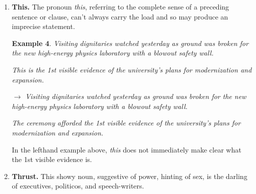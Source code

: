 \documentclass{article}
\newtheorem{example}{Example}
\begin{document}
\begin{enumerate}
	But it often doesn't work, if only because repetition makes it sound boring or silly.
	
	Consider these strategies to avoid an awkward overuse of {\it he or she} or an unintentional emphasis on the masculine:
	
	Use the plural rather than the singular.
	\begin{example}
		The writer must address his readers' concerns.
		
		$\to$ Writers must address their readers' concerns.
	\end{example}
	Eliminate the pronoun altogether.
	\begin{example}
		The writer must address his readers' concerns.
		
		$\to$ The writer must address reader's concerns.
	\end{example}
	Substitute the 2nd person for the 3rd person.
	\begin{example}
		The writer must address his readers' concerns.
		
		$\to$ As a writer, you must address your readers' concerns.
	\end{example}
	No one need fear to use {\it he} if common sense supports it.
	
	If you think {\it she} is a handy substitute for {\it he}, try it and see what happens.
	
	Alternatively, put all controversial nouns in the plural and avoid the choice of sex altogether, although you may find your prose sounding general and diffuse as a result.
	\item {\bf This.} The pronoun {\it this}, referring to the complete sense of a preceding sentence or clause, can't always carry the load and so may produce an imprecise statement.
	\begin{example}
		Visiting dignitaries watched yesterday as ground was broken for the new high-energy physics laboratory with a blowout safety wall.
		
		This is the 1st visible evidence of the university's plans for modernization and expansion.
		
		$\to$ Visiting dignitaries watched yesterday as ground was broken for the new high-energy physics laboratory with a blowout safety wall.
		
		The ceremony afforded the 1st visible evidence of the university's plans for modernization and expansion.
	\end{example}
	In the lefthand example above, {\it this} does not immediately make clear what the 1st visible evidence is.
	\item {\bf Thrust.} This showy noun, suggestive of power, hinting of sex, is the darling of executives, politicos, and speech-writers.
	

\end{enumerate}
\end{document}
